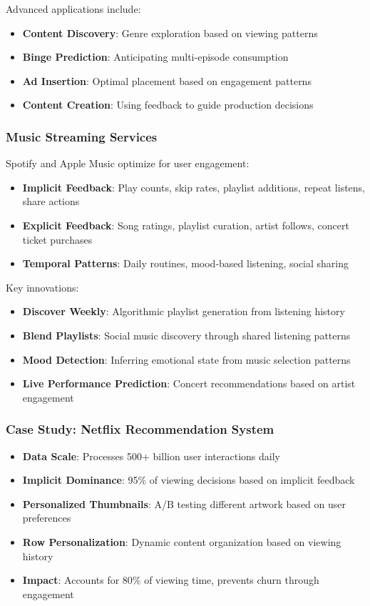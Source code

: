 \documentclass[acmsmall,review,anonymous]{acmart}
\begin{document}
Advanced applications include:
\begin{itemize}
    \item \textbf{Content Discovery}: Genre exploration based on viewing patterns
    \item \textbf{Binge Prediction}: Anticipating multi-episode consumption
    \item \textbf{Ad Insertion}: Optimal placement based on engagement patterns
    \item \textbf{Content Creation}: Using feedback to guide production decisions
\end{itemize}

\subsubsection{Music Streaming Services}

Spotify and Apple Music optimize for user engagement:

\begin{itemize}
    \item \textbf{Implicit Feedback}: Play counts, skip rates, playlist additions, repeat listens, share actions
    \item \textbf{Explicit Feedback}: Song ratings, playlist curation, artist follows, concert ticket purchases
    \item \textbf{Temporal Patterns}: Daily routines, mood-based listening, social sharing
\end{itemize}

Key innovations:
\begin{itemize}
    \item \textbf{Discover Weekly}: Algorithmic playlist generation from listening history
    \item \textbf{Blend Playlists}: Social music discovery through shared listening patterns
    \item \textbf{Mood Detection}: Inferring emotional state from music selection patterns
    \item \textbf{Live Performance Prediction}: Concert recommendations based on artist engagement
\end{itemize}

\subsubsection{Case Study: Netflix Recommendation System}

\begin{itemize}
    \item \textbf{Data Scale}: Processes 500+ billion user interactions daily
    \item \textbf{Implicit Dominance}: 95\% of viewing decisions based on implicit feedback
    \item \textbf{Personalized Thumbnails}: A/B testing different artwork based on user preferences
    \item \textbf{Row Personalization}: Dynamic content organization based on viewing history
    \item \textbf{Impact}: Accounts for 80\% of viewing time, prevents churn through engagement
\end{itemize}
\end{document}
